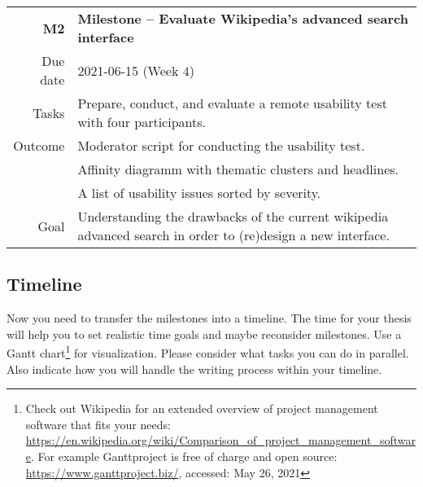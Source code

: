 \begin{table}[h]
\small
\colorbox{usethiscolorhere}{
\centering
\begin{tabularx}{\textwidth}{@{} r Y @{}}
	\textbf{M2}
	& \textbf{Milestone -- Evaluate Wikipedia's advanced search interface}\vspace{2mm}\\
	Due date & 2021-06-15 (Week $4$)\vspace{2mm}\\
     Tasks & Prepare, conduct, and evaluate a remote usability test with four participants.\vspace{2mm}\\
    Outcome & Moderator script for conducting the usability test.\\
    & Affinity diagramm with thematic clusters and headlines.\\
    & A list of usability issues sorted by severity.\vspace{2mm}\\
    Goal & Understanding the drawbacks of the current wikipedia advanced search in order to (re)design a new interface.\vspace{2mm}\\
    
\end{tabularx}
}
\end{table}


\clearpage
\subsection{Timeline}
\label{subsec:timeline}
Now you need to transfer the milestones into a timeline. The time for your thesis will help you to set realistic time goals and maybe reconsider milestones. Use a Gantt chart\footnote{Check out Wikipedia for an extended overview of project management software that fits your needs: \url{https://en.wikipedia.org/wiki/Comparison_of_project_management_software}. For example Ganttproject is free of charge and open source: \url{https://www.ganttproject.biz/}, accessed: May 26, 2021} for visualization. Please consider what tasks you can do in parallel. Also indicate how you will handle the writing process within your timeline.


